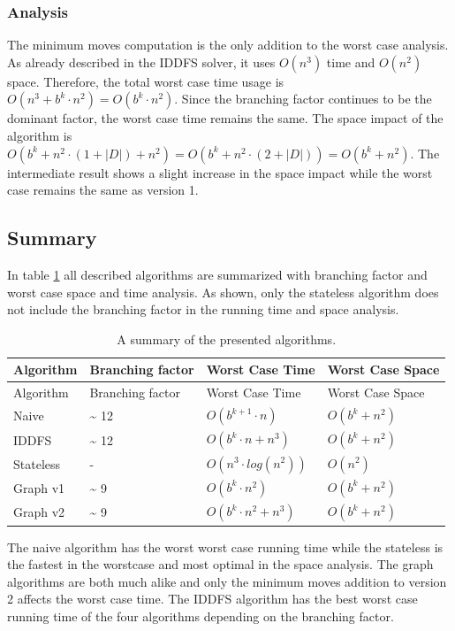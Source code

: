 \documentclass[]{article}
\begin{document}
\subsubsection{Analysis}\label{analysis-2}

The minimum moves computation is the only addition to the worst case
analysis. As already described in the IDDFS solver, it uses \(O(n^3)\)
time and \(O(n^2)\) space. Therefore, the total worst case time usage is
\(O(n^3+b^k \cdot n^2) = O(b^k \cdot n^2)\). Since the branching factor
continues to be the dominant factor, the worst case time remains the
same. The space impact of the algorithm is
\(O(b^k + n^2 \cdot (1 + |D|) + n^2) = O(b^k + n^2 \cdot (2 + |D|)) = O(b^k + n^2)\).
The intermediate result shows a slight increase in the space impact
while the worst case remains the same as version 1.

\subsection{Summary}\label{summary}

In table \ref{table:summary} all described algorithms are summarized
with branching factor and worst case space and time analysis. As shown,
only the stateless algorithm does not include the branching factor in
the running time and space analysis.

\begin{longtable}[c]{@{}llll@{}}
\caption{A summary of the presented algorithms.
\label{table:summary}}\tabularnewline
\toprule
Algorithm & Branching factor & Worst Case Time & Worst Case
Space\tabularnewline
\midrule
\endfirsthead
\toprule
Algorithm & Branching factor & Worst Case Time & Worst Case
Space\tabularnewline
\midrule
\endhead
Naive & \textasciitilde{} 12 & \(O(b^{k+1} \cdot n)\) &
\(O(b^k + n^2)\)\tabularnewline
IDDFS & \textasciitilde{} 12 & \(O(b^k \cdot n + n^3)\) &
\(O(b^k + n^2)\)\tabularnewline
Stateless & - & \(O(n^3 \cdot log(n^2))\) & \(O(n^2)\)\tabularnewline
Graph v1 & \textasciitilde{} 9 & \(O(b^k \cdot n^2)\) &
\(O(b^k+n^2)\)\tabularnewline
Graph v2 & \textasciitilde{} 9 & \(O(b^k \cdot n^2 + n^3)\) &
\(O(b^k+n^2)\)\tabularnewline
\bottomrule
\end{longtable}

The naive algorithm has the worst worst case running time while the
stateless is the fastest in the worstcase and most optimal in the space
analysis. The graph algorithms are both much alike and only the minimum
moves addition to version 2 affects the worst case time. The IDDFS
algorithm has the best worst case running time of the four algorithms
depending on the branching factor.
\end{document}
